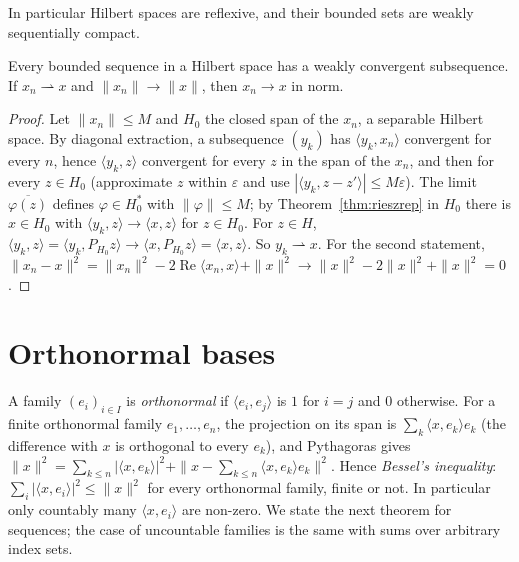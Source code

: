 In particular Hilbert spaces are reflexive, and their bounded sets are weakly sequentially compact.

\begin{corollary}\label{cor:weakcompact}
Every bounded sequence in a Hilbert space has a weakly convergent subsequence. If $x_n\rightharpoonup x$ and $\|x_n\|\to\|x\|$, then $x_n\to x$ in norm.
\end{corollary}
\begin{proof}
Let $\|x_n\|\le M$ and $H_0$ the closed span of the $x_n$, a separable Hilbert space. By diagonal extraction, a subsequence $(y_k)$ has $\langle y_k,x_n\rangle$ convergent for every $n$, hence $\langle y_k,z\rangle$ convergent for every $z$ in
the span of the $x_n$, and then for every $z\in H_0$ (approximate $z$ within $\varepsilon$ and use $|\langle y_k,z-z'\rangle|\le M\varepsilon$). The limit $\overline{\varphi(z)}$ defines $\varphi\in H_0^*$ with $\|\varphi\|\le M$; by
Theorem~\ref{thm:rieszrep} in $H_0$ there is $x\in H_0$ with $\langle y_k,z\rangle\to\langle x,z\rangle$ for $z\in H_0$. For $z\in H$, $\langle y_k,z\rangle=\langle y_k,P_{H_0}z\rangle\to\langle x,P_{H_0}z\rangle=\langle x,z\rangle$. So $y_k\rightharpoonup x$.
For the second statement, $\|x_n-x\|^2=\|x_n\|^2-2\operatorname{Re}\langle x_n,x\rangle+\|x\|^2\to\|x\|^2-2\|x\|^2+\|x\|^2=0$.
\end{proof}

\section{Orthonormal bases}

A family $(e_i)_{i\in I}$ is \emph{orthonormal} if $\langle e_i,e_j\rangle$ is $1$ for $i=j$ and $0$ otherwise. For a finite orthonormal family $e_1,\dots,e_n$, the projection on its span is $\sum_k\langle x,e_k\rangle e_k$ (the difference with $x$ is
orthogonal to every $e_k$), and Pythagoras gives $\|x\|^2=\sum_{k\le n}|\langle x,e_k\rangle|^2+\|x-\sum_{k\le n}\langle x,e_k\rangle e_k\|^2$. Hence \emph{Bessel's inequality}: $\sum_i|\langle x,e_i\rangle|^2\le\|x\|^2$ for every orthonormal
family, finite or not. In particular only countably many $\langle x,e_i\rangle$ are non-zero. We state the next theorem for sequences; the case of uncountable families is the same with sums over arbitrary index sets.


